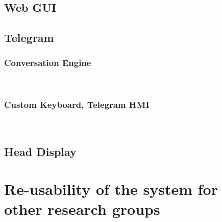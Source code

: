 \documentclass[runningheads,a4paper]{llncs}
\begin{document}
\subsection{Web GUI}

\subsection{Telegram\texttrademark\hspace{0em}}

\subsubsection{Conversation Engine}\


\subsubsection{Custom Keyboard, Telegram HMI}\



\subsection{Head Display}



\section{Re-usability of the system for other research groups}


%






%
\newpage

\end{document}
